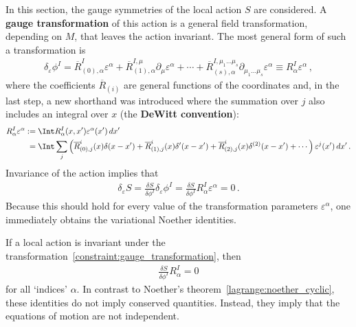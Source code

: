     In this section, the gauge symmetries of the local action $S$ are considered. A \textbf{gauge transformation} of this action is a general field transformation, depending on $M$, that leaves the action invariant. The most general form of such a transformation is
    \begin{gather}
        \label{constraint:gauge_transformation}
        \delta_\varepsilon\phi^I = \overline{R}^I_{(0),\alpha}\varepsilon^\alpha + \overline{R}^{I,\mu}_{(1),\alpha}\partial_\mu\varepsilon^\alpha + \cdots + \overline{R}^{I,\mu_1\ldots\mu_s}_{(s),\alpha}\partial_{\mu_1\ldots\mu_s}\varepsilon^\alpha\equiv R^I_\alpha\varepsilon^\alpha\,,
    \end{gather}
    where the coefficients $\overline{R}_{(i)}$ are general functions of the coordinates and, in the last step, a new shorthand was introduced where the summation over $j$ also includes an integral over $x$ (the \textbf{DeWitt convention}):
    \begin{align}
        R^I_\alpha\varepsilon^\alpha &:= \Int R^I_\alpha(x,x')\varepsilon^\alpha(x')\,dx'\\
        &\phantom{:}= \Int\sum_j\left(\overline{R}^i_{(0),j}(x)\delta(x-x')+\overline{R}^i_{(1),j}(x)\delta'(x-x')+\overline{R}^i_{(2),j}(x)\delta^{(2)}(x-x')+\cdots\right)\varepsilon^j(x')\,dx'\,.\nonumber
    \end{align}
    Invariance of the action implies that
    \begin{gather}
        \delta_\varepsilon S = \frac{\delta S}{\delta\phi^I}\delta_\varepsilon\phi^I = \frac{\delta S}{\delta\phi^I}R^I_\alpha\varepsilon^\alpha = 0\,.
    \end{gather}
    Because this should hold for every value of the transformation parameters $\varepsilon^\alpha$, one immediately obtains the variational Noether identities.
    \begin{property}\label{field:noether_identity}
        If a local action is invariant under the transformation~\eqref{constraint:gauge_transformation}, then
        \begin{gather}
            \frac{\delta S}{\delta\phi^I}R^I_\alpha = 0
        \end{gather}
        for all `indices' $\alpha$. In contrast to Noether's theorem~\ref{lagrange:noether_cyclic}, these identities do not imply conserved quantities. Instead, they imply that the equations of motion are not independent.
    \end{property}

